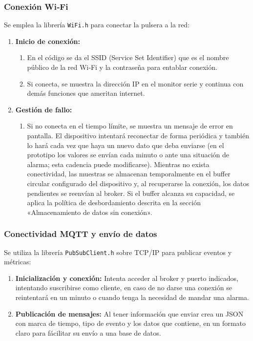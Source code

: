 \documentclass[12pt, a4paper]{article}
\begin{document}
	\subsubsection{Conexión Wi‑Fi}
	Se emplea la librería \texttt{WiFi.h} para conectar la pulsera a la red:
	
	\begin{enumerate}
		\item \textbf{Inicio de conexión:}
		\begin{enumerate}
			\item En el código se da el SSID (Service Set Identifier) que es el nombre público de la red Wi‑Fi y la contraseña para entablar conexión.
			\item Si conecta, se muestra la dirección IP en el monitor serie y continua con demás funciones que ameritan internet.
		\end{enumerate}
		\item \textbf{Gestión de fallo:}
		\begin{enumerate}
			\item Si no conecta en el tiempo límite, se muestra un mensaje de error en pantalla. El dispositivo intentará reconectar de forma periódica y también lo hará cada vez que haya un nuevo dato que deba enviarse (en el prototipo los valores se envían cada minuto o ante una situación de alarma; esta cadencia puede modificarse). Mientras no exista conectividad, las muestras se almacenan temporalmente en el buffer circular configurado del dispositivo y, al recuperarse la conexión, los datos pendientes se reenvían al broker. Si el buffer alcanza su capacidad, se aplica la política de desbordamiento descrita en la sección «Almacenamiento de datos sin conexión».
	
		\end{enumerate}
	\end{enumerate}
	
	\subsubsection{Conectividad MQTT y envío de datos}
	Se utiliza la librería \texttt{PubSubClient.h} sobre TCP/IP para publicar eventos y métricas:
	
	\begin{enumerate}
	\item \textbf{Inicialización y conexión:} Intenta acceder al broker y puerto indicados, intentando suscribirse como cliente, en caso de no darse una conexión se reintentará en un minuto o cuando tenga la necesidad de mandar una alarma. 
	\item \textbf{Publicación de mensajes:} Al tener información que enviar crea un JSON con marca de tiempo, tipo de evento y los datos que contiene, en un formato claro para fácilitar su envío a una base de datos.
	\end{enumerate}
	
\end{document}
